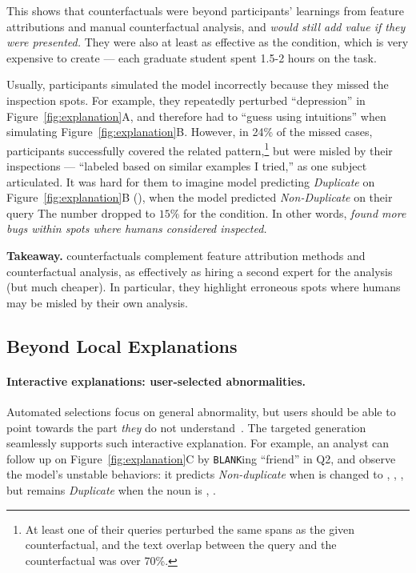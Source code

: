 This shows that \cshap counterfactuals were beyond participants' learnings from feature attributions and manual counterfactual analysis, and \emph{would still add value if they were presented.}
They were also at least as effective as the \chuman condition, which is very expensive to create --- each graduate student spent 1.5-2 hours on the task.


Usually, participants simulated the model incorrectly because they missed the inspection spots.
For example, they repeatedly perturbed ``depression'' in Figure~\ref{fig:explanation}A, and therefore had to ``guess using intuitions'' when simulating Figure~\ref{fig:explanation}B.
However, in 24\% of the missed \cshap cases, participants successfully covered the related pattern,\footnote{At least one of their queries perturbed the same spans as the given counterfactual, and the text overlap between the query and the counterfactual was over 70\%.} but were misled by their inspections --- ``labeled based on similar examples I tried,'' as one subject articulated.
It was hard for them to imagine model predicting \emph{Duplicate} on Figure~\ref{fig:explanation}B (), when the model predicted \emph{Non-Duplicate} on their query 
The number dropped to $15\%$ for the \chuman condition.
In other words, \emph{\cshap found more bugs within spots where humans considered inspected.}

\noindent\textbf{Takeaway.}
\sysname counterfactuals complement feature attribution methods and counterfactual analysis, as effectively as hiring a second expert for the analysis (but much cheaper).
In particular, they highlight erroneous spots where humans may be misled by their own analysis.

\subsection{Beyond Local Explanations}
\label{subsec:exp_more}

\paragraph{Interactive explanations: user-selected abnormalities.}
Automated selections focus on general abnormality, but users should be able to point towards the part \emph{they} do not understand~\cite{miller}.
The targeted generation seamlessly supports such interactive explanation.
For example, an analyst can follow up on Figure~\ref{fig:explanation}C by \texttt{BLANK}ing ``friend'' in Q2, and observe the model's unstable behaviors: it predicts \emph{Non-duplicate} when  is changed to , , , but remains \emph{Duplicate} when the noun is , .


